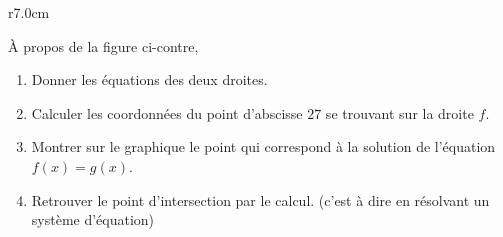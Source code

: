 
\begin{exercice}\label{exosmath-0229}

\begin{wrapfigure}{r}{7.0cm}
            \vspace{-1cm}        %
                \centering
                    
                \end{wrapfigure}

        À propos de la figure ci-contre, 
        \begin{enumerate}
            \item
                Donner les équations des deux droites.
            \item
                Calculer les coordonnées du point d'abscisse \( 27\) se trouvant sur la droite \( f\).
            \item
                Montrer sur le graphique le point qui correspond à la solution de l'équation \( f(x)=g(x)\).
            \item
                Retrouver le point d'intersection par le calcul. (c'est à dire en résolvant un système d'équation)
        \end{enumerate}

\end{exercice}
